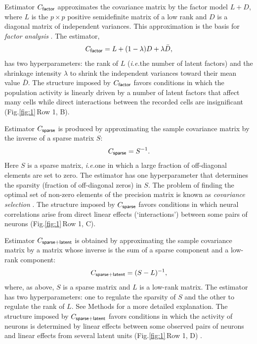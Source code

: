 \documentclass[10pt]{article}
\newcommand{\sq}[1]{\lq#1\rq}
\newcommand{\figref}[2]{Fig.\;\ref{fig:#1}\,#2}
\newcommand{\ie}{\emph{i.e.}\;}
\begin{document}
Estimator $C_{\sf factor}$ approximates the covariance matrix by the factor model $L + D$, where $L$ is the $p\times p$ positive semidefinite matrix of a low rank and $D$ is a diagonal matrix of independent variances. This approximation is the basis for \emph{factor analysis} \cite{Anderson:2003}. The estimator, 
\begin{equation}\label{eq:c-factor}
C_{\sf factor} = L + (1-\lambda)D + \lambda \bar D,
\end{equation}
has two hyperparameters: the rank of $L$ (\ie the number of latent factors) and the shrinkage intensity $\lambda$ to shrink the independent variances toward their mean value $\bar D$. The structure imposed by $C_{\sf factor}$ favors conditions in which the population activity is linearly driven by a number of latent factors that affect many cells while direct interactions between the recorded cells are insignificant (\figref{1}{Row 1, B}).   

Estimator $C_{\sf sparse}$ is produced by approximating the sample covariance matrix by the inverse of a sparse matrix $S$: 
\begin{equation}\label{eq:c-sparse}
C_{\sf sparse} = S^{-1}.
\end{equation}
Here $S$ is a sparse matrix, \ie one in which a large fraction of off-diagonal elements are set to zero.  The estimator has one hyperparameter that determines the sparsity (fraction of off-diagonal zeros) in $S$. The problem of finding the optimal set of non-zero elements of the precision matrix is known as \emph{covariance selection} \cite{Dempster:1972}. The structure imposed by $C_{\sf sparse}$ favors conditions in which neural correlations arise from direct linear effects (\sq{interactions}) between some pairs of neurons (\figref{1}{Row 1, C}).  


Estimator $C_{\sf sparse+latent}$ is obtained by approximating the sample covariance matrix by a matrix whose inverse is the sum of a sparse component and a low-rank component: 
\begin{equation}\label{eq:c-sl}
C_{\sf sparse+latent} = (S - L)^{-1},
\end{equation}
where, as above, $S$ is a sparse matrix and $L$ is a low-rank matrix. The estimator has two hyperparameters: one to regulate the sparsity of $S$ and the other to regulate the rank of $L$. See Methods for a more detailed explanation. The structure imposed by $C_{\sf sparse+latent}$ favors conditions in which the activity of neurons is determined by linear effects between some observed pairs of neurons and linear effects from several latent units (\figref{1}{Row 1, D}) \cite{Chandrasekaran:2010,Ma:2013}.
\end{document}
